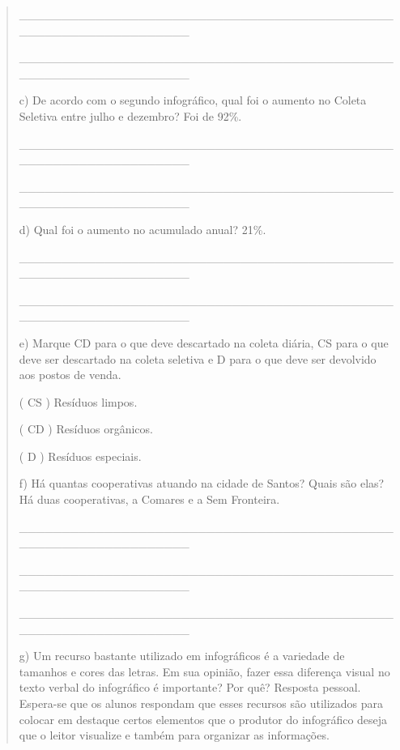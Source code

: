 \begin{escolha}
\begin{escolha}
{\begin{quote}
\_\_\_\_\_\_\_\_\_\_\_\_\_\_\_\_\_\_\_\_\_\_\_\_\_\_\_\_\_\_\_\_\_\_\_\_\_\_\_\_\_\_\_\_\_\_\_\_\_\_\_\_\_\_\_\_\_\_\_\_\_\_\_\_

\_\_\_\_\_\_\_\_\_\_\_\_\_\_\_\_\_\_\_\_\_\_\_\_\_\_\_\_\_\_\_\_\_\_\_\_\_\_\_\_\_\_\_\_\_\_\_\_\_\_\_\_\_\_\_\_\_\_\_\_\_\_\_\_

c) De acordo com o segundo infográfico, qual foi o aumento no Coleta
Seletiva entre julho e dezembro? Foi de 92\%.

\_\_\_\_\_\_\_\_\_\_\_\_\_\_\_\_\_\_\_\_\_\_\_\_\_\_\_\_\_\_\_\_\_\_\_\_\_\_\_\_\_\_\_\_\_\_\_\_\_\_\_\_\_\_\_\_\_\_\_\_\_\_\_\_

\_\_\_\_\_\_\_\_\_\_\_\_\_\_\_\_\_\_\_\_\_\_\_\_\_\_\_\_\_\_\_\_\_\_\_\_\_\_\_\_\_\_\_\_\_\_\_\_\_\_\_\_\_\_\_\_\_\_\_\_\_\_\_\_

d) Qual foi o aumento no acumulado anual? 21\%.

\_\_\_\_\_\_\_\_\_\_\_\_\_\_\_\_\_\_\_\_\_\_\_\_\_\_\_\_\_\_\_\_\_\_\_\_\_\_\_\_\_\_\_\_\_\_\_\_\_\_\_\_\_\_\_\_\_\_\_\_\_\_\_\_

\_\_\_\_\_\_\_\_\_\_\_\_\_\_\_\_\_\_\_\_\_\_\_\_\_\_\_\_\_\_\_\_\_\_\_\_\_\_\_\_\_\_\_\_\_\_\_\_\_\_\_\_\_\_\_\_\_\_\_\_\_\_\_\_

e) Marque CD para o que deve descartado na coleta diária, CS para o que
deve ser descartado na coleta seletiva e D para o que deve ser devolvido
aos postos de venda.

( CS ) Resíduos limpos.

( CD ) Resíduos orgânicos.

( D ) Resíduos especiais.

f) Há quantas cooperativas atuando na cidade de Santos? Quais são elas?
Há duas cooperativas, a Comares e a Sem Fronteira.

\_\_\_\_\_\_\_\_\_\_\_\_\_\_\_\_\_\_\_\_\_\_\_\_\_\_\_\_\_\_\_\_\_\_\_\_\_\_\_\_\_\_\_\_\_\_\_\_\_\_\_\_\_\_\_\_\_\_\_\_\_\_\_\_

\_\_\_\_\_\_\_\_\_\_\_\_\_\_\_\_\_\_\_\_\_\_\_\_\_\_\_\_\_\_\_\_\_\_\_\_\_\_\_\_\_\_\_\_\_\_\_\_\_\_\_\_\_\_\_\_\_\_\_\_\_\_\_\_

\_\_\_\_\_\_\_\_\_\_\_\_\_\_\_\_\_\_\_\_\_\_\_\_\_\_\_\_\_\_\_\_\_\_\_\_\_\_\_\_\_\_\_\_\_\_\_\_\_\_\_\_\_\_\_\_\_\_\_\_\_\_\_\_

g) Um recurso bastante utilizado em infográficos é a variedade de
tamanhos e cores das letras. Em sua opinião, fazer essa diferença visual
no texto verbal do infográfico é importante? Por quê? Resposta pessoal.
Espera-se que os alunos respondam que esses recursos são utilizados para
colocar em destaque certos elementos que o produtor do infográfico
deseja que o leitor visualize e também para organizar as informações.


\end{quote}}
\end{escolha}
\end{escolha}
